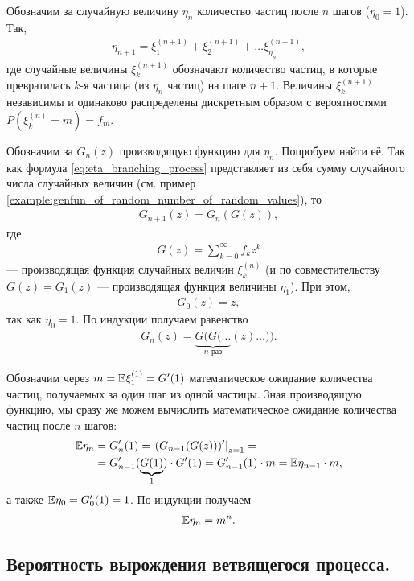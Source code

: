 \documentclass[../main.tex]{subfiles}
\begin{document}
Обозначим за случайную величину $ \eta_n $ количество частиц после $ n $ шагов ($ \eta_0 = 1 $). Так,
\begin{align}
 \label{eq:eta_branching_process}
 \eta_{n+1} = \xi^{(n+1)}_{1} + \xi^{(n+1)}_2 + \ldots \xi^{(n+1)}_{\eta_n},
\end{align} где случайные величины $ \xi^{(n+1)}_k $ обозначают количество частиц, в которые превратилась $ k $-я частица (из $ \eta_n $ частиц) на шаге $ n+1 $. Величины $ \xi_k^{(n+1)} $ независимы и одинаково распределены дискретным образом с вероятностями $ P(\xi^{(n)}_k = m) = f_m $.

Обозначим за $ G_n(z) $ производящую функцию для $ \eta_n $. Попробуем найти её. Так как формула \eqref{eq:eta_branching_process} представляет из себя сумму случайного числа случайных величин (см. пример \ref{example:genfun_of_random_number_of_random_values}), то
\begin{align*}
 G_{n+1}(z) = G_n(G(z)),
 \end{align*} где \begin{align*}
 G(z) = \sum_{k=0}^{\infty}f_kz^{k}
\end{align*} --- производящая функция случайных величин $ \xi^{(n)}_k $ (и по совместительству $ G(z) = G_1(z) $ --- производящая функция величины $ \eta_1 $). При этом,
\begin{align*}
 G_0(z) = z,
\end{align*} так как $ \eta_0 = 1 $. По индукции получаем равенство
\begin{align*}
 G_n(z) = \underbrace{G(G(\ldots}_{n\text{ раз}}(z)\ldots)).
\end{align*}

Обозначим через $ m = \mathbb E \xi_1^{(1)} = G'(1) $ математическое ожидание количества частиц, получаемых за один шаг из одной частицы. Зная производящую функцию, мы сразу же можем вычислить математическое ожидание количества частиц после $ n $ шагов:
\begin{align*}
 \mathbb E \eta_n &= G_n'(1) = \left.(G_{n-1}(G(z)))'\right|_{z=1} = \\
  &= G_{n-1}'(\underbrace{G(1)}_{1}) \cdot G'(1) = G_{n-1}'(1) \cdot m = \mathbb E\eta_{n-1} \cdot m,
 \end{align*} а также $ \mathbb E \eta_0 = G_0'(1) = 1 $. По индукции получаем
 \begin{align*}
  \mathbb E\eta_n = m^{n}.
 \end{align*}

 \subsection{Вероятность вырождения ветвящегося процесса.}
\end{document}
